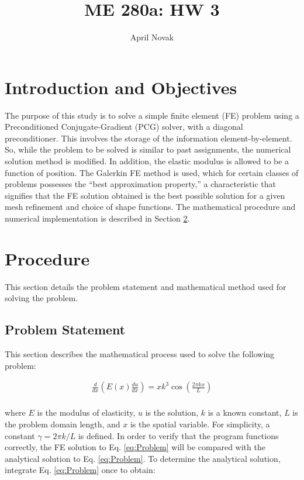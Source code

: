 \documentclass[10pt]{article}
\begin{document}
\title{ME 280a: HW 3}
\author{April Novak}

\maketitle

\section{Introduction and Objectives}

The purpose of this study is to solve a simple finite element (FE) problem using a Preconditioned Conjugate-Gradient (PCG) solver, with a diagonal preconditioner. This involves the storage of the information element-by-element. So, while the problem to be solved is similar to past assignments, the numerical solution method is modified. In addition, the elastic modulus is allowed to be a function of position. The Galerkin FE method is used, which for certain classes of problems possesses the ``best approximation property,'' a characteristic that signifies that the FE solution obtained is the best possible solution for a given mesh refinement and choice of shape functions. The mathematical procedure and numerical implementation is described in Section \ref{sec:Procedure}.

\section{Procedure}
\label{sec:Procedure}

This section details the problem statement and mathematical method used for solving the problem.

\subsection{Problem Statement}

This section describes the mathematical process used to solve the following problem:

\begin{equation}
\label{eq:Problem}
\begin{aligned}
\frac{d}{dx}\left(E(x)\frac{du}{dx}\right)=xk^3\cos{\left(\frac{2\pi kx}{L}\right)}\\
\end{aligned}
\end{equation}

where \(E\) is the modulus of elasticity, \(u\) is the solution, \(k\) is a known constant, \(L\) is the problem domain length, and \(x\) is the spatial variable. For simplicity, a constant \(\gamma=2\pi k/L\) is defined. In order to verify that the program functions correctly, the FE solution to Eq. \eqref{eq:Problem} will be compared with the analytical solution to Eq. \eqref{eq:Problem}. To determine the analytical solution, integrate Eq. \eqref{eq:Problem} once to obtain:
\end{document}
